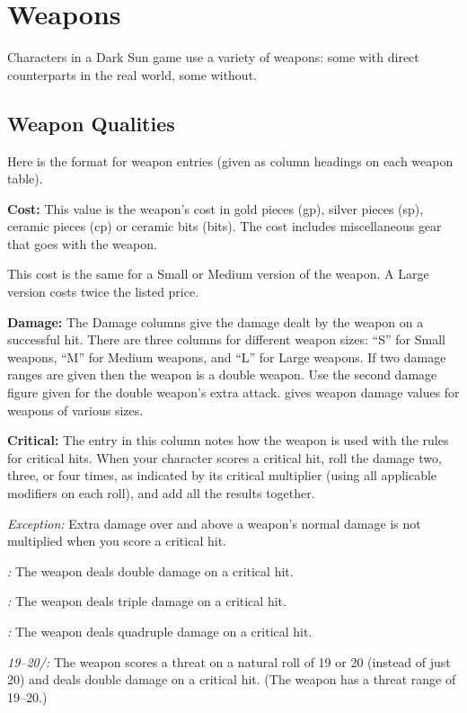 \section{Weapons}
Characters in a {\tableheader Dark Sun} game use a variety of weapons: some with direct counterparts in the real world, some without.




\subsection{Weapon Qualities}
Here is the format for weapon entries (given as column headings on each weapon table).

\textbf{Cost:} This value is the weapon's cost in gold pieces (gp), silver pieces (sp), ceramic pieces (cp) or ceramic bits (bits). The cost includes miscellaneous gear that goes with the weapon.

This cost is the same for a Small or Medium version of the weapon. A Large version costs twice the listed price.

\textbf{Damage:} The Damage columns give the damage dealt by the weapon on a successful hit. There are three columns for different weapon sizes: ``S'' for Small weapons, ``M'' for Medium weapons, and ``L'' for Large weapons. If two damage ranges are given then the weapon is a double weapon. Use the second damage figure given for the double weapon's extra attack.  gives weapon damage values for weapons of various sizes.

\textbf{Critical:} The entry in this column notes how the weapon is used with the rules for critical hits. When your character scores a critical hit, roll the damage two, three, or four times, as indicated by its critical multiplier (using all applicable modifiers on each roll), and add all the results together.

\textit{Exception:} Extra damage over and above a weapon's normal damage is not multiplied when you score a critical hit.

\textit{:} The weapon deals double damage on a critical hit.

\textit{:} The weapon deals triple damage on a critical hit.

\textit{:} The weapon deals quadruple damage on a critical hit.

\textit{19--20/:} The weapon scores a threat on a natural roll of 19 or 20 (instead of just 20) and deals double damage on a critical hit. (The weapon has a threat range of 19--20.)

